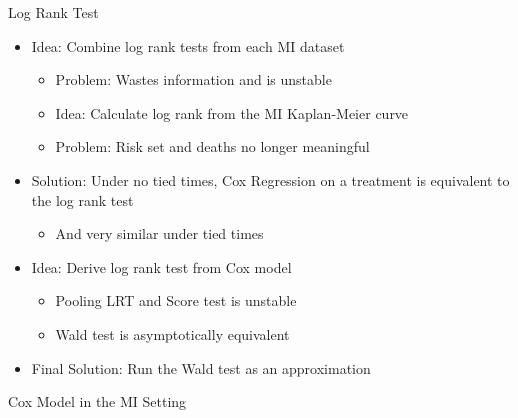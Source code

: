 \begin{frame}{Log Rank Test}
 \begin{itemize}
  \item Idea: Combine log rank tests from each MI dataset
  \begin{itemize}
  \item Problem: Wastes information and is unstable \cite{Marshall2009}
  \item Idea: Calculate log rank from the MI Kaplan-Meier curve
  \item Problem: Risk set and deaths no longer meaningful
  \end{itemize}

  \item Solution: Under no tied times, Cox Regression on a treatment is equivalent to the
log rank test
\begin{itemize}
 \item And very similar under tied times
\end{itemize}
\item Idea: Derive log rank test from Cox model
\begin{itemize}
 \item Pooling LRT and Score test is unstable \cite{Marshall2009}
 \item Wald test is asymptotically equivalent
\end{itemize}
 \item Final Solution: Run the Wald test as an approximation

 \end{itemize}

\end{frame}

\begin{frame}{Cox Model in the MI Setting}
 
\end{frame}
